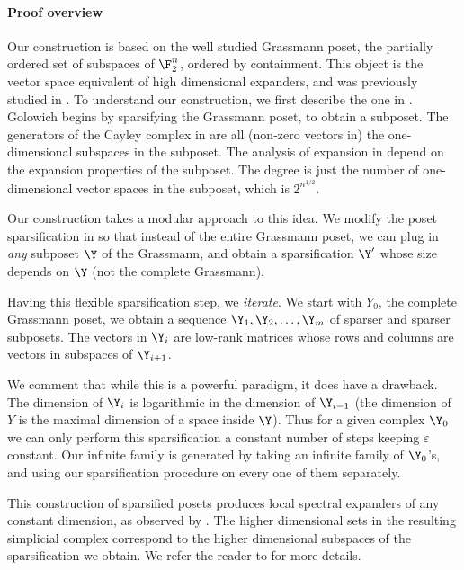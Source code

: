 
\paragraph{Proof overview} Our construction is based on the well studied Grassmann poset, the partially ordered set of subspaces of \(\F_2^n\), ordered by containment. This object is the vector space equivalent of high dimensional expanders, and was previously studied in \cite{DiksteinDFH2018,kaufmanT2021garland,GaitondeHKLZ2022,Golowich2023}. To understand our construction, we first describe the one in \cite{Golowich2023}. Golowich begins by sparsifying the Grassmann poset, to obtain a subposet. The generators of the Cayley complex in \cite{Golowich2023} are all (non-zero vectors in) the one-dimensional subspaces in the subposet. The analysis of expansion in \cite{Golowich2023} depend on the expansion properties of the subposet. The degree is just the number of one-dimensional vector spaces in the subposet, which is \(2^{n^{1/2}}\).

Our construction takes a modular approach to this idea. We modify the poset sparsification in \cite{Golowich2023} so that instead of the entire Grassmann poset, we can plug in \emph{any} subposet \(\Y\) of the Grassmann, and obtain a sparsification \(\Y'\) whose size depends on \(\Y\) (not the complete Grassmann).

Having this flexible sparsification step, we \emph{iterate}. We start with \(Y_0\), the complete Grassmann poset, we obtain a sequence \(\Y_1,\Y_2,\dots,\Y_m\) of sparser and sparser subposets. The vectors in \(\Y_i\) are low-rank matrices whose rows and columns are vectors in subspaces of \(\Y_{i+1}\).

We comment that while this is a powerful paradigm, it does have a drawback. The dimension of \(\Y_{i}\) is logarithmic in the dimension of \(\Y_{i-1}\) (the dimension of \(Y\) is the maximal dimension of a space inside \(\Y\)). Thus for a given complex \(\Y_0\) we can only perform this sparsification a constant number of steps keeping \(\varepsilon\) constant. Our infinite family is generated by taking an infinite family of \(\Y_0\)'s, and using our sparsification procedure on every one of them separately.

This construction of sparsified posets produces local spectral expanders of any constant dimension, as observed by \cite{Golowich2023}. The higher dimensional sets in the resulting simplicial complex correspond to the higher dimensional subspaces of the sparsification we obtain. We refer the reader to  for more details.

